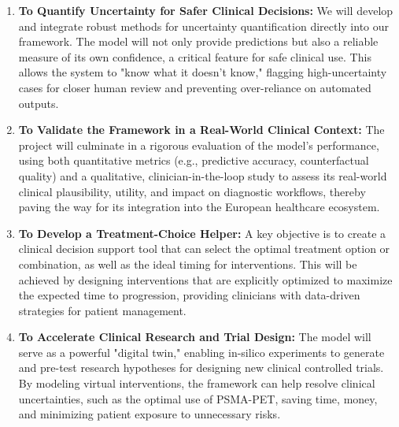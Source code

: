 \documentclass[11pt, a4paper]{article}
\begin{document}
\begin{enumerate}
    \item \textbf{To Quantify Uncertainty for Safer Clinical Decisions:} We will develop and integrate robust methods for uncertainty quantification directly into our framework. The model will not only provide predictions but also a reliable measure of its own confidence, a critical feature for safe clinical use. This allows the system to "know what it doesn't know," flagging high-uncertainty cases for closer human review and preventing over-reliance on automated outputs.
    \item \textbf{To Validate the Framework in a Real-World Clinical Context:} The project will culminate in a rigorous evaluation of the model's performance, using both quantitative metrics (e.g., predictive accuracy, counterfactual quality) and a qualitative, clinician-in-the-loop study to assess its real-world clinical plausibility, utility, and impact on diagnostic workflows, thereby paving the way for its integration into the European healthcare ecosystem.
    \item \textbf{To Develop a Treatment-Choice Helper:} A key objective is to create a clinical decision support tool that can select the optimal treatment option or combination, as well as the ideal timing for interventions. This will be achieved by designing interventions that are explicitly optimized to maximize the expected time to progression, providing clinicians with data-driven strategies for patient management.
    \item \textbf{To Accelerate Clinical Research and Trial Design:} The model will serve as a powerful "digital twin," enabling in-silico experiments to generate and pre-test research hypotheses for designing new clinical controlled trials. By modeling virtual interventions, the framework can help resolve clinical uncertainties, such as the optimal use of PSMA-PET, saving time, money, and minimizing patient exposure to unnecessary risks.
    
\end{enumerate}
\end{document}
